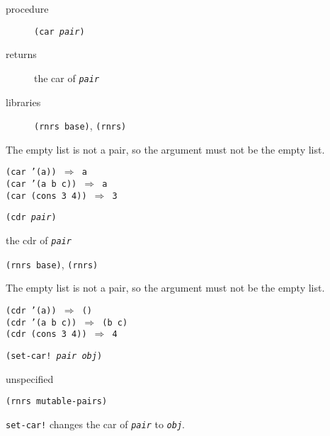 \begin{description}

\label{objects_s38}\item[procedure] \texttt{(car \textit{pair})}



\item[returns] the car of \texttt{\textit{pair}}


\item[libraries] \texttt{(rnrs base)}, \texttt{(rnrs)}
\end{description}


The empty list is not a pair, so the argument must not be the empty list.


\begin{alltt}
(car '(a)) \(\Rightarrow\) a
(car '(a b c)) \(\Rightarrow\) a
(car (cons 3 4)) \(\Rightarrow\) 3
\end{alltt}

\begin{description}

\label{objects_s39}\item[procedure] \texttt{(cdr \textit{pair})}



\item[returns] the cdr of \texttt{\textit{pair}}


\item[libraries] \texttt{(rnrs base)}, \texttt{(rnrs)}
\end{description}


The empty list is not a pair, so the argument must not be the empty list.


\begin{alltt}
(cdr '(a)) \(\Rightarrow\) ()
(cdr '(a b c)) \(\Rightarrow\) (b c)
(cdr (cons 3 4)) \(\Rightarrow\) 4
\end{alltt}

\begin{description}

\label{objects_s40}\item[procedure] \texttt{(set-car! \textit{pair} \textit{obj})}



\item[returns] unspecified


\item[libraries] \texttt{(rnrs mutable-pairs)}
\end{description}

\texttt{set-car!} changes the car of \texttt{\textit{pair}} to \texttt{\textit{obj}}.

